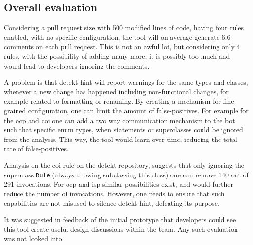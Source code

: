 \documentclass{report}
\begin{document}


\subsection{Overall evaluation}
    Considering a pull request size with 500 modified lines of code, having four rules enabled, with no specific configuration, the tool will on average generate 6.6 comments on each pull request. This is not an awful lot, but considering only 4 rules, with the possibility of adding many more, it is possibly too much and would lead to developers ignoring the comments. 


A problem is that detekt-hint will report warnings for the same types and classes, whenever a new change has happened including non-functional changes, for example related to formatting or renaming. By creating a mechanism for fine-grained configuration, one can limit the amount of false-positives. For example for the \gls{ocp} and \gls{coi} one can add a two way communication mechanism to the bot such that specific enum types, when statements or superclasses could be ignored from the analysis. This way, the tool would learn over time, reducing the total rate of false-positives. 

Analysis on the \gls{coi} rule on the detekt repository, suggests that only ignoring the superclass \texttt{Rule} (always allowing subclassing this class) one can remove 140 out of 291 invocations. For \gls{ocp} and \gls{isp} similar possibilities exist, and would further reduce the number of invocations. However, one needs to ensure that such capabilities are not misused to silence detekt-hint, defeating its purpose.

It was suggested in feedback of the initial prototype that developers could see this tool create useful design discussions within the team. Any such evaluation was not looked into. 
\end{document}
